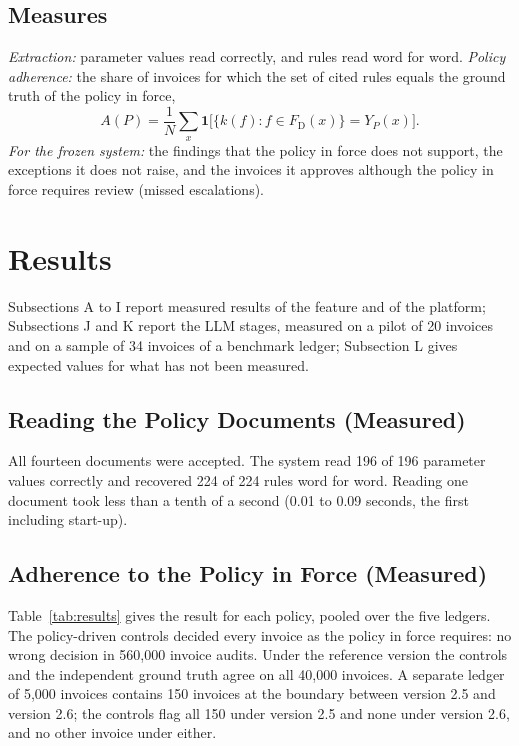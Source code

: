 \documentclass[conference]{IEEEtran}
\begin{document}
\subsection{Measures}
\textit{Extraction:} parameter values read correctly, and rules read word for word. \textit{Policy adherence:} the share of invoices for which the set of cited rules equals the ground truth of the policy in force,
\begin{equation}
A(P)=\frac{1}{N}\sum_{x}\mathbf{1}\bigl[\{k(f):f\in F_{\mathrm{D}}(x)\}=Y_P(x)\bigr].
\label{eq:adherence}
\end{equation}
\textit{For the frozen system:} the findings that the policy in force does not support, the exceptions it does not raise, and the invoices it approves although the policy in force requires review (missed escalations).

\section{Results}
\label{sec:results}
Subsections A to I report measured results of the feature and of the platform; Subsections J and K report the LLM stages, measured on a pilot of 20 invoices and on a sample of 34 invoices of a benchmark ledger; Subsection L gives expected values for what has not been measured.

\subsection{Reading the Policy Documents (Measured)}
All fourteen documents were accepted. The system read 196 of 196 parameter values correctly and recovered 224 of 224 rules word for word. Reading one document took less than a tenth of a second (0.01 to 0.09 seconds, the first including start-up).

\subsection{Adherence to the Policy in Force (Measured)}
Table~\ref{tab:results} gives the result for each policy, pooled over the five ledgers. The policy-driven controls decided every invoice as the policy in force requires: no wrong decision in 560{,}000 invoice audits. Under the reference version the controls and the independent ground truth agree on all 40{,}000 invoices. A separate ledger of 5{,}000 invoices contains 150 invoices at the boundary between version 2.5 and version 2.6; the controls flag all 150 under version 2.5 and none under version 2.6, and no other invoice under either.
\end{document}
